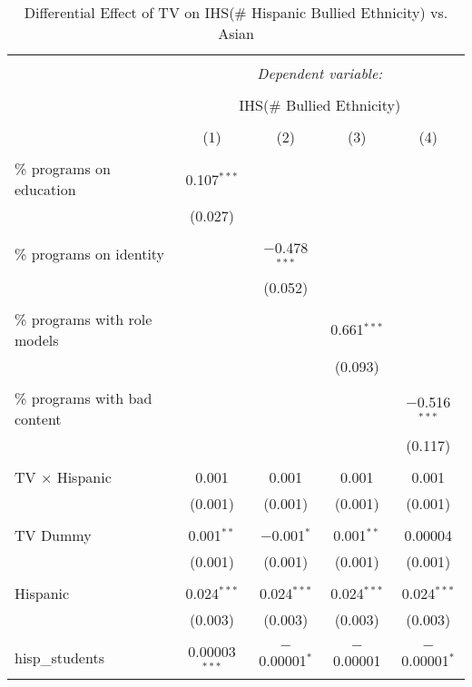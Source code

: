 
\begin{table}[!htbp] \centering 
  \caption{Differential Effect of TV on IHS(\# Hispanic Bullied Ethnicity) vs. Asian} 
  \label{} 
\begin{tabular}{@{\extracolsep{-2pt}}lcccc} 
\\[-1.8ex]\hline 
\hline \\[-1.8ex] 
 & \multicolumn{4}{c}{\textit{Dependent variable:}} \\ 
\cline{2-5} 
\\[-1.8ex] & \multicolumn{4}{c}{IHS(\# Bullied Ethnicity)} \\ 
\\[-1.8ex] & (1) & (2) & (3) & (4)\\ 
\hline \\[-1.8ex] 
 \% programs on education & 0.107$^{***}$ &  &  &  \\ 
  & (0.027) &  &  &  \\ 
  & & & & \\ 
 \% programs on identity &  & $-$0.478$^{***}$ &  &  \\ 
  &  & (0.052) &  &  \\ 
  & & & & \\ 
 \% programs with role models &  &  & 0.661$^{***}$ &  \\ 
  &  &  & (0.093) &  \\ 
  & & & & \\ 
 \% programs with bad content &  &  &  & $-$0.516$^{***}$ \\ 
  &  &  &  & (0.117) \\ 
  & & & & \\ 
 TV $\times$ Hispanic & 0.001 & 0.001 & 0.001 & 0.001 \\ 
  & (0.001) & (0.001) & (0.001) & (0.001) \\ 
  & & & & \\ 
 TV Dummy & 0.001$^{**}$ & $-$0.001$^{*}$ & 0.001$^{**}$ & 0.00004 \\ 
  & (0.001) & (0.001) & (0.001) & (0.001) \\ 
  & & & & \\ 
 Hispanic & 0.024$^{***}$ & 0.024$^{***}$ & 0.024$^{***}$ & 0.024$^{***}$ \\ 
  & (0.003) & (0.003) & (0.003) & (0.003) \\ 
  & & & & \\ 
 hisp\_students & 0.00003$^{***}$ & $-$0.00001$^{*}$ & $-$0.00001 & $-$0.00001$^{*}$ \\ 

\end{tabular}
\end{table}
